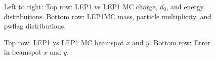 \begin{figure}[H]
\hfill
\caption{Left to right: Top row: LEP1 vs LEP1 MC charge, $d_0$, and energy distributions. Bottom row: LEP1MC mass, particle multiplicity, and pwflag distributions.}
\end{figure}

\begin{figure}[H]
\centering
{}\hfill
{}\hfill %
\hfill
{}\hfill
\caption{Top row: LEP1 vs LEP1 MC beamspot $x$ and $y$. Bottom row: Error in beamspot $x$ and $y$.}
\end{figure}

